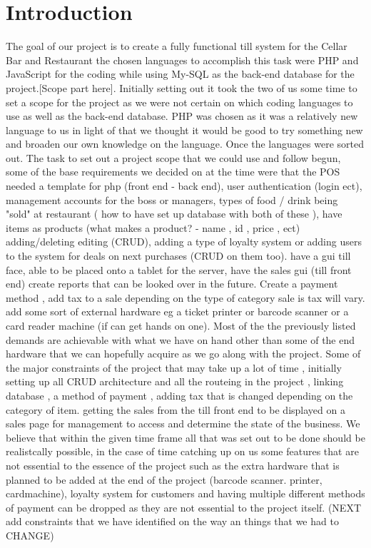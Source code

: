 \chapter{Introduction}
The goal of our project is to create a fully functional till system for the Cellar Bar and Restaurant the chosen languages to accomplish this task were PHP and JavaScript for the coding while using My-SQL as the back-end database for the project.[Scope part here]. Initially setting out it took the two of us some time to set a scope for the project as we were not certain on which coding languages to use as well as the back-end database. PHP was chosen as it was a relatively new language to us in light of that we thought it would be good to try something new and broaden our own knowledge on the language. Once the languages were sorted out. The task to set out a project scope that we could use and follow begun, some of the base requirements we decided on at the time were that the POS needed a template for php (front end - back end), user authentication (login ect), management accounts for the boss or managers, types of food / drink being "sold" at restaurant ( how to have set up database with both of these ), have items as products (what makes a product? - name , id , price , ect) adding/deleting editing (CRUD), adding a type of loyalty system or adding users to the system for deals on next purchases (CRUD on them too). have a gui till face, able to be placed onto a tablet for the server, have the sales gui (till front end) create reports that can be looked over in the future. Create a payment method , add tax to a sale depending on the type of category sale is tax will vary. add some sort of external hardware eg a ticket printer or barcode scanner or a card reader machine (if can get hands on one). Most of the the previously listed demands are achievable with what we have on hand other than some of the end hardware that we can hopefully acquire as we go along with the project. Some of the major constraints of the project that may take up a lot of time , initially setting up all CRUD architecture and all the routeing in the project , linking database , a method of payment , adding tax that is changed depending on the category of item. getting the sales from the till front end to be displayed on a sales page for management to access and determine the state of the business. We believe that within the given time frame all that was set out to be done should be realistcally possible, in the case of time catching up on us some features that are not essential to the essence of the project such as the extra hardware that is planned to be added at the end of the project (barcode scanner. printer, cardmachine), loyalty system for customers and having multiple different methods of payment can be dropped as they are not essential to the project itself. (NEXT add constraints that we have identified on the way an things that we had to CHANGE)